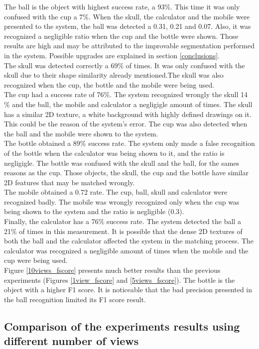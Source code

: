 	The ball is the object with highest success rate, a 93\%. 
	This time it was only confused with the cup a 7\%. 
	When the skull, the calculator and the mobile were presented to the system, the ball was detected a 0.31, 0.21 and 0.07. 
	Also, it was recognized a negligible ratio when the cup and the bottle were shown. 
	Those results are high and may be attributed to the improvable segmentation performed in the system. 
	Possible upgrades are explained in section \ref{conclusions}.
	\\
	The skull was detected correctly a 69\% of times. 
	It was only confused with the skull due to their shape similarity already mentioned.The skull was also recognized when the cup, the bottle and the mobile were being used. 
	\\
	The cup had a success rate of 76\%. 
	The system recognized wrongly the skull 14 \% and the ball, the mobile and calculator a negligigle amount of times. 
	The skull has a similar 2D texture, a white background with highly defined drawings on it. 
	This could be the reason of the system's error. 
	The cup was also detected when the ball and the mobile were shown to the system. 
	\\
	The bottle obtained a 89\% success rate. 
	The system only made a false recognition of the bottle when the calculator was being shown to it, and the ratio is negligigle. 
	The bottle was confused with the skull and the ball, for the sames reasons as the cup. 
	Those objects, the skull, the cup and the bottle have similar 2D features that may be matched wrongly. 
	\\
	The mobile obtained a 0.72 rate. 
	The cup, ball, skull and calculator were recognized badly. 
	The mobile was wrongly recognized only when the cup was being shown to the system and the ratio is negligible (0.3). 
	\\
	Finally, the calculator has a 76\% success rate. 
	The system detected the ball a 21\% of times in this measurement. 
	It is possible that the dense 2D textures of both the ball and the calculator affected the system in the matching process. 
	The calculator was recognized a negligible amount of times when the mobile and the cup were being used. 
	\\

	Figure \ref{10views_fscore} presents much better results than the previous experiments (Figures \ref{1view_fscore} and \ref{5views_fscore}).
	The bottle is the object with a higher F1 score. 
	It is noticeable that the bad precision presented in the ball recognition limited its F1 score result. 


	\subsection{Comparison of the experiments results using different number of views}